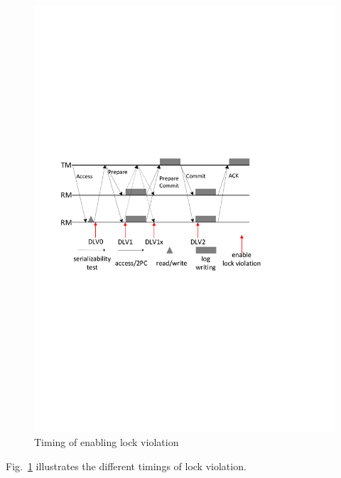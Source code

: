 \documentclass[conference]{IEEEtran}
\begin{document}
\begin{figure}[tbp]
  \centerline{\includegraphics[scale=0.50]{figure/lock_violation_time.pdf}}
  \caption
  {Timing of enabling lock violation}
\label{fig:lock_violation_time}
\end{figure}

Fig.~\ref{fig:lock_violation_time} illustrates the different timings of lock violation.
\end{document}
